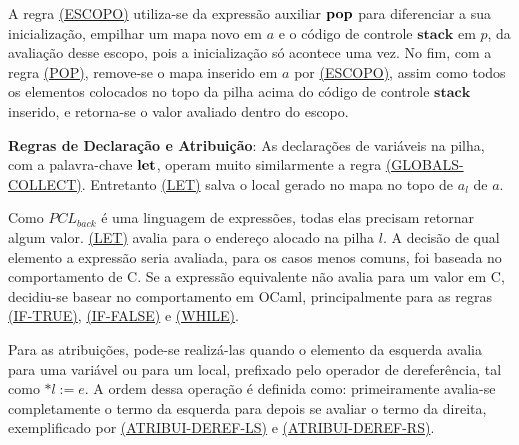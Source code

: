 A regra \hyperref[rule:escopo]{(ESCOPO)} utiliza-se da expressão auxiliar $\mathbf{pop}$ para diferenciar a sua inicialização, empilhar um mapa novo em $a$ e o código de controle $\mathbf{stack}$ em $p$, da avaliação desse escopo, pois a inicialização só acontece uma vez. No fim, com a regra \hyperref[rule:pop]{(POP)}, remove-se o mapa inserido em $a$ por \hyperref[rule:escopo]{(ESCOPO)}, assim como todos os elementos colocados no topo da pilha acima do código de controle $\mathbf{stack}$ inserido, e retorna-se o valor avaliado dentro do escopo.

\label{sec:pcl-back:semantica:atribui}

\textbf{Regras de Declaração e Atribuição}: As declarações de variáveis na pilha, com a palavra-chave $\mathbf{let}$, operam muito similarmente a regra \hyperref[rule:globals-collect]{(GLOBALS-COLLECT)}. Entretanto \hyperref[rule:let]{(LET)} salva o local gerado no mapa no topo de $a_l$ de $a$. 


Como $PCL_{back}$ é uma linguagem de expressões, todas elas precisam retornar algum valor. \hyperref[rule:let]{(LET)} avalia para o endereço alocado na pilha $l$. A decisão de qual elemento a expressão seria avaliada, para os casos menos comuns, foi baseada no comportamento de C. Se a expressão equivalente não avalia para um valor em C, decidiu-se basear no comportamento em OCaml, principalmente para as regras \hyperref[rule:if-true]{(IF-TRUE)}, \hyperref[rule:if-false]{(IF-FALSE)} e \hyperref[rule:while]{(WHILE)}.

Para as atribuições, pode-se realizá-las quando o elemento da esquerda avalia para uma variável ou para um local, prefixado pelo operador de dereferência, tal como $\text{*}l := e$. A ordem dessa operação é definida como: primeiramente avalia-se completamente o termo da esquerda para depois se avaliar o termo da direita, exemplificado por \hyperref[rule:atribui-deref-ls]{(ATRIBUI-DEREF-LS)} e \hyperref[rule:atribui-deref-rs]{(ATRIBUI-DEREF-RS)}.


